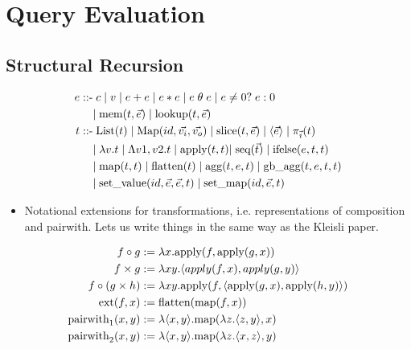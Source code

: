 \section{Query Evaluation}

\subsection{Structural Recursion}

\def\ktclist{\mbox{List}}
\def\ktcmap{\mbox{Map}}
\def\apply{\mbox{apply}}
\def\seq{\mbox{seq}}
\def\ifelse{\mbox{ifelse}}
\def\mem{\mbox{mem}}
\def\lookup{\mbox{lookup}}
\def\slice{\mbox{slice}}
\def\setval{\mbox{set\_value}}
\def\setmap{\mbox{set\_map}}
\def\ktmap{\mbox{map}}
\def\ktflat{\mbox{flatten}}
\def\ktagg{\mbox{agg}}
\def\ktgb{\mbox{gb\_agg}}
\def\ktpwl{\mbox{pairwith}_1}
\def\ktpwr{\mbox{pairwith}_2}
\def\ktext{\mbox{ext}}
\def\ktid{\mbox{id}}

\begin{align*}
e \; \mbox{::-} & \; c \;|\; v \;|\; e + e \;|\; e * e \;|\; e \; \theta \; e
\;|\; e \neq 0?\; e : 0 \\
& |\; \mem(t,\vec{e}) \;|\; \lookup(t,\vec{e})\\
t \; \mbox{::-} & \; \ktclist(t) \;|\; \ktcmap(id,\vec{v_i},\vec{v_o})
  \; | \; \slice(t,\vec{e}) \;|\; \tuple{\vec{e}} \;|\; \pi_{\vec{i}}(t) \\
& |\; \lambda v . t \;|\; \Lambda v1,v2.t \;|\; \apply(t,t)
  |\; \seq(\vec{t}) \;|\; \ifelse(e,t,t) \\
& |\; \ktmap(t,t) \;|\; \ktflat(t) \;|\; \ktagg(t,e,t) \;|\; \ktgb(t,e,t,t)\\
& |\; \setval(id,\vec{e},\vec{e},t) \;|\; \setmap(id,\vec{e},t)
\end{align*}

\begin{itemize}
  \item Notational extensions for transformations, i.e. representations of
  composition and pairwith. Lets us write things in the same way as the Kleisli
  paper.
\end{itemize}

\begin{align*}
f \circ g & := \lambda x. \apply(f, \apply(g,x))
\\
f \times g & := \lambda xy. \tuple{apply(f, x), apply(g, y)}
\\
f \circ (g \times h) & := \lambda xy.
\apply(f, \tuple{\apply(g, x), \apply(h, y)})
\\
\ktext(f,x) & := \ktflat(\ktmap(f,x))
\\
\ktpwl(x,y) & := \lambda \tuple{x,y}. \ktmap(\lambda z.\tuple{z,y}, x)
\\
\ktpwr(x,y) & := \lambda \tuple{x,y}. \ktmap(\lambda z.\tuple{x,z}, y)
\end{align*}

